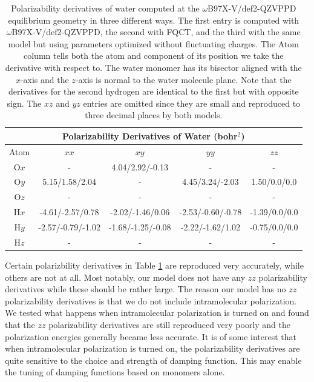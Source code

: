 \documentclass[journal=jacsat,manuscript=article]{achemso}
\begin{document}
\begin{table}[ht!]
  \begin{center}
  \begin{tabular}{ccccc}
      \multicolumn{5}{c}{Polarizability Derivatives of Water (bohr$^2$)} \\\hline
       Atom & $xx$ & $xy$ & $yy$ & $zz$ \\\hline
       O$x$ & -                 & 4.04/2.92/-0.13    & -                  & -  \\
       O$y$ & 5.15/1.58/2.04    & -                  & 4.45/3.24/-2.03    & 1.50/0.0/0.0  \\
       O$z$ & -                 & -                  & -                  & -  \\
       H$x$ & -4.61/-2.57/0.78  & -2.02/-1.46/0.06   & -2.53/-0.60/-0.78  & -1.39/0.0/0.0  \\
       H$y$ & -2.57/-0.79/-1.02 & -1.68/-1.25/-0.08  & -2.22/-1.62/1.02   & -0.75/0.0/0.0  \\
       H$z$ & -                 & -                  & -                  & -  \\

  \end{tabular}
  \end{center}
  \vspace{-3mm}
  \caption{Polarizability derivatives of water computed at the $\omega$B97X-V/def2-QZVPPD equilibrium geometry
  in three different ways. The first entry is computed with $\omega$B97X-V/def2-QZVPPD, the second with FQCT,
  and the third with the same model but using parameters optimized without fluctuating charges.
  The Atom column tells both the atom and component
  of its position we take the derivative with respect to.
  The water monomer has its bisector aligned with the $x$-axis and the $z$-axis is normal to the water 
  molecule plane. Note that the derivatives for the second hydrogen are identical to the first
  but with opposite sign. The $xz$ and $yz$ entries are omitted since they are small and
  reproduced to three decimal places by both models.}
  \label{tab:pol_derivs}
\end{table}

Certain polarizbility derivatives in Table \ref{tab:pol_derivs} are reproduced very accurately,
while others are not at all. Most notably, our model does not have any $zz$ polarizability derivatives
while these should be rather large. The reason our model has no $zz$ polarizability derivatives
is that we do not include intramolecular polarization. We tested what happens when intramolecular
polarization is turned on and found that the $zz$ polarizability derivatives are still reproduced
very poorly and the polarization energies generally became less accurate. It is of some interest that
when intramolecular polarization is turned on, the polarizability derivatives are quite sensitive
to the choice and strength of damping function. This may enable the tuning of damping functions
based on monomers alone.
\end{document}
